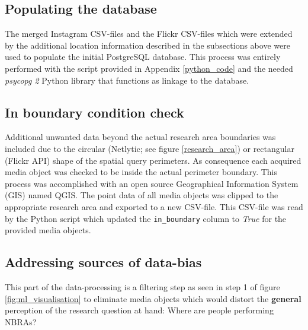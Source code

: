 \subsection{Populating the database} \label{populate_db}
The merged Instagram CSV-files and the Flickr CSV-files which were extended by the additional location information described in the subsections above were used to populate the initial PostgreSQL database. This process was entirely performed with the script provided in Appendix \ref{python_code} and the needed \textit{psycopg 2} Python library that functions as linkage to the database.

\subsection{In boundary condition check} \label{in_boundary}
Additional unwanted data beyond the actual research area boundaries was included due to the circular (Netlytic; see figure \ref{research_area}) or rectangular (Flickr API) shape of the spatial query perimeters. As consequence each acquired media object was checked to be inside the actual perimeter boundary. This process was accomplished with an open source Geographical Information System (GIS) named QGIS. The point data of all media objects was clipped to the appropriate research area and exported to a new CSV-file. This CSV-file was read by the Python script which updated the \texttt{in\_boundary} column to \textit{True} for the provided media objects.

\subsection{Addressing sources of data-bias} \label{sources_data_bias}
This part of the data-processing is a filtering step as seen in step 1 of figure \ref{fig:ml_visualisation} to eliminate media objects which would distort the \textbf{general} perception of the research question at hand: Where are people performing NBRAs?

